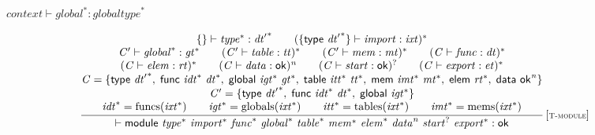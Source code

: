 $\boxed{{\mathit{context}} \vdash {{\mathit{global}}^\ast} : {{\mathit{globaltype}}^\ast}}$

$$
\begin{array}{@{}c@{}}\displaystyle
\frac{
\begin{array}{@{}c@{}}
\{ \begin{array}[t]{@{}l@{}}
 \}\end{array} \vdash {{\mathit{type}}^\ast} : {{\mathit{dt}'}^\ast}
 \qquad
(\{ \begin{array}[t]{@{}l@{}}
\mathsf{type}~{{\mathit{dt}'}^\ast} \}\end{array} \vdash {\mathit{import}} : {\mathit{ixt}})^\ast
 \\
{\mathit{C}'} \vdash {{\mathit{global}}^\ast} : {{\mathit{gt}}^\ast}
 \qquad
({\mathit{C}'} \vdash {\mathit{table}} : {\mathit{tt}})^\ast
 \qquad
({\mathit{C}'} \vdash {\mathit{mem}} : {\mathit{mt}})^\ast
 \qquad
({\mathit{C}} \vdash {\mathit{func}} : {\mathit{dt}})^\ast
 \\
({\mathit{C}} \vdash {\mathit{elem}} : {\mathit{rt}})^\ast
 \qquad
({\mathit{C}} \vdash {\mathit{data}} : \mathsf{ok})^{{\mathit{n}}}
 \qquad
({\mathit{C}} \vdash {\mathit{start}} : \mathsf{ok})^?
 \qquad
({\mathit{C}} \vdash {\mathit{export}} : {\mathit{et}})^\ast
 \\
{\mathit{C}} = \{ \begin{array}[t]{@{}l@{}}
\mathsf{type}~{{\mathit{dt}'}^\ast},\; \mathsf{func}~{{\mathit{idt}}^\ast}~{{\mathit{dt}}^\ast},\; \mathsf{global}~{{\mathit{igt}}^\ast}~{{\mathit{gt}}^\ast},\; \mathsf{table}~{{\mathit{itt}}^\ast}~{{\mathit{tt}}^\ast},\; \mathsf{mem}~{{\mathit{imt}}^\ast}~{{\mathit{mt}}^\ast},\; \mathsf{elem}~{{\mathit{rt}}^\ast},\; \mathsf{data}~{\mathsf{ok}^{{\mathit{n}}}} \}\end{array}
 \\
{\mathit{C}'} = \{ \begin{array}[t]{@{}l@{}}
\mathsf{type}~{{\mathit{dt}'}^\ast},\; \mathsf{func}~{{\mathit{idt}}^\ast}~{{\mathit{dt}}^\ast},\; \mathsf{global}~{{\mathit{igt}}^\ast} \}\end{array}
 \\
{{\mathit{idt}}^\ast} = {\mathrm{funcs}}({{\mathit{ixt}}^\ast})
 \qquad
{{\mathit{igt}}^\ast} = {\mathrm{globals}}({{\mathit{ixt}}^\ast})
 \qquad
{{\mathit{itt}}^\ast} = {\mathrm{tables}}({{\mathit{ixt}}^\ast})
 \qquad
{{\mathit{imt}}^\ast} = {\mathrm{mems}}({{\mathit{ixt}}^\ast})
\end{array}
}{
{ \vdash }\;\mathsf{module}~{{\mathit{type}}^\ast}~{{\mathit{import}}^\ast}~{{\mathit{func}}^\ast}~{{\mathit{global}}^\ast}~{{\mathit{table}}^\ast}~{{\mathit{mem}}^\ast}~{{\mathit{elem}}^\ast}~{{\mathit{data}}^{{\mathit{n}}}}~{{\mathit{start}}^?}~{{\mathit{export}}^\ast} : \mathsf{ok}
} \, {[\textsc{\scriptsize T{-}module}]}
\qquad
\end{array}
$$

